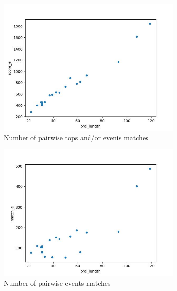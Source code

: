 \documentclass[12pt,a4paper]{article}
\begin{document}
\begin{figure}[H]
\begin{subfigure}[t]{0.5\linewidth}
		\includegraphics[width=1\linewidth]{plots/lenVSse.jpg}
		\caption{Number of pairwise tops and/or events matches}
		\label{sub:graph3}
	\end{subfigure}
	\begin{subfigure}[t]{0.5\linewidth}
		\centering
		\includegraphics[width=1\linewidth]{plots/lenVSme.jpg}
		\caption{Number of pairwise events matches}
		\label{sub:graph4}
	\end{subfigure}
	\begin{subfigure}[t]{0.5\linewidth}
		\centering

\end{subfigure}
\end{figure}
\end{document}

